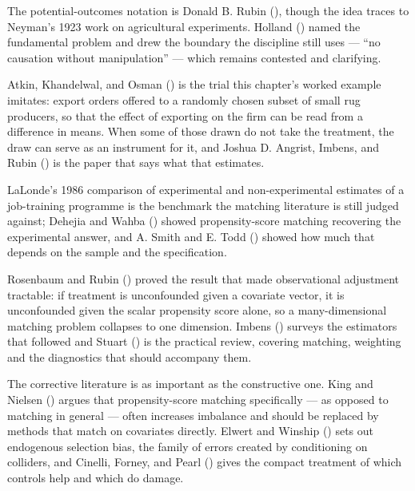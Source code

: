 \documentclass[
  letterpaper,
  10pt,
  twoside,
  openright,
  numbers=noenddot,
  chapterprefix=true]{scrbook}
\begin{document}
\begin{qmiblit}

The potential-outcomes notation is Donald B. Rubin
(), though the idea traces to Neyman's
1923 work on agricultural experiments. Holland
() named the fundamental problem and
drew the boundary the discipline still uses --- ``no causation without
manipulation'' --- which remains contested and clarifying.

Atkin, Khandelwal, and Osman () is the
trial this chapter's worked example imitates: export orders offered to a
randomly chosen subset of small rug producers, so that the effect of
exporting on the firm can be read from a difference in means. When some
of those drawn do not take the treatment, the draw can serve as an
instrument for it, and Joshua D. Angrist, Imbens, and Rubin
() is the paper that says what that
estimates.

LaLonde's 1986 comparison of experimental and non-experimental estimates
of a job-training programme is the benchmark the matching literature is
still judged against; Dehejia and Wahba
() showed propensity-score matching
recovering the experimental answer, and A. Smith and E. Todd
() showed how much that depends on the
sample and the specification.

Rosenbaum and Rubin () proved the
result that made observational adjustment tractable: if treatment is
unconfounded given a covariate vector, it is unconfounded given the
scalar propensity score alone, so a many-dimensional matching problem
collapses to one dimension. Imbens ()
surveys the estimators that followed and Stuart
() is the practical review, covering
matching, weighting and the diagnostics that should accompany them.

The corrective literature is as important as the constructive one. King
and Nielsen () argues that propensity-score
matching specifically --- as opposed to matching in general --- often
increases imbalance and should be replaced by methods that match on
covariates directly. Elwert and Winship
() sets out endogenous selection bias,
the family of errors created by conditioning on colliders, and Cinelli,
Forney, and Pearl () gives the compact
treatment of which controls help and which do damage.

\end{qmiblit}
\end{document}
